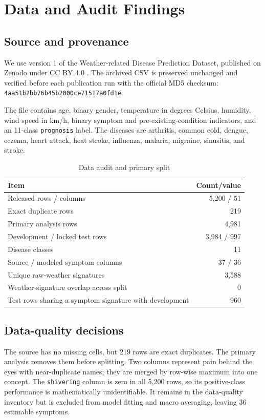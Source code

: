 \documentclass[conference]{IEEEtran}
\begin{document}
\section{Data and Audit Findings}

\subsection{Source and provenance}

We use version 1 of the Weather-related Disease Prediction Dataset, published
on Zenodo under CC BY 4.0 \cite{shan2024}. The archived CSV is preserved
unchanged and verified before each publication run with the official MD5
checksum:
\texttt{4aa51b2bb76b45b2000ce71517a0fd1e}.

The file contains age, binary gender, temperature in degrees Celsius, humidity,
wind speed in km/h, binary symptom and pre-existing-condition indicators, and
an 11-class \texttt{prognosis} label. The diseases are arthritis, common cold,
dengue, eczema, heart attack, heat stroke, influenza, malaria, migraine,
sinusitis, and stroke.

\begin{table}[t]
\caption{Data audit and primary split}
\label{tab:data}
\centering
\begin{tabular}{lr}
\toprule
Item & Count/value\\
\midrule
Released rows / columns & 5,200 / 51\\
Exact duplicate rows & 219\\
Primary analysis rows & 4,981\\
Development / locked test rows & 3,984 / 997\\
Disease classes & 11\\
Source / modeled symptom columns & 37 / 36\\
Unique raw-weather signatures & 3,588\\
Weather-signature overlap across split & 0\\
Test rows sharing a symptom signature with development & 960\\
\bottomrule
\end{tabular}
\end{table}

\subsection{Data-quality decisions}

The source has no missing cells, but 219 rows are exact duplicates. The primary
analysis removes them before splitting. Two columns represent pain behind the
eyes with near-duplicate names; they are merged by row-wise maximum into one
concept. The \texttt{shivering} column is zero in all 5,200 rows, so its
positive-class performance is mathematically unidentifiable. It remains in the
data-quality inventory but is excluded from model fitting and macro averaging,
leaving 36 estimable symptoms.
\end{document}

